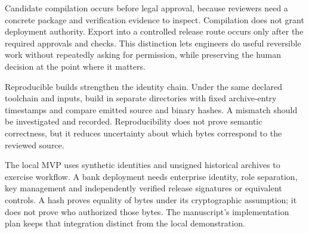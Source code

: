 Candidate compilation occurs before legal approval, because reviewers need a
concrete package and verification evidence to inspect. Compilation does not grant
deployment authority. Export into a controlled release route occurs only after
the required approvals and checks. This distinction lets engineers do useful
reversible work without repeatedly asking for permission, while preserving the
human decision at the point where it matters.

Reproducible builds strengthen the identity chain. Under the same declared
toolchain and inputs, build in separate directories with fixed archive-entry
timestamps and compare emitted source and binary hashes. A mismatch should be
investigated and recorded. Reproducibility does not prove semantic correctness,
but it reduces uncertainty about which bytes correspond to the reviewed source.

The local MVP uses synthetic identities and unsigned historical archives to
exercise workflow. A bank deployment needs enterprise identity, role separation,
key management and independently verified release signatures or equivalent
controls. A hash proves equality of bytes under its cryptographic assumption;
it does not prove who authorized those bytes. The manuscript's implementation
plan keeps that integration distinct from the local demonstration.
